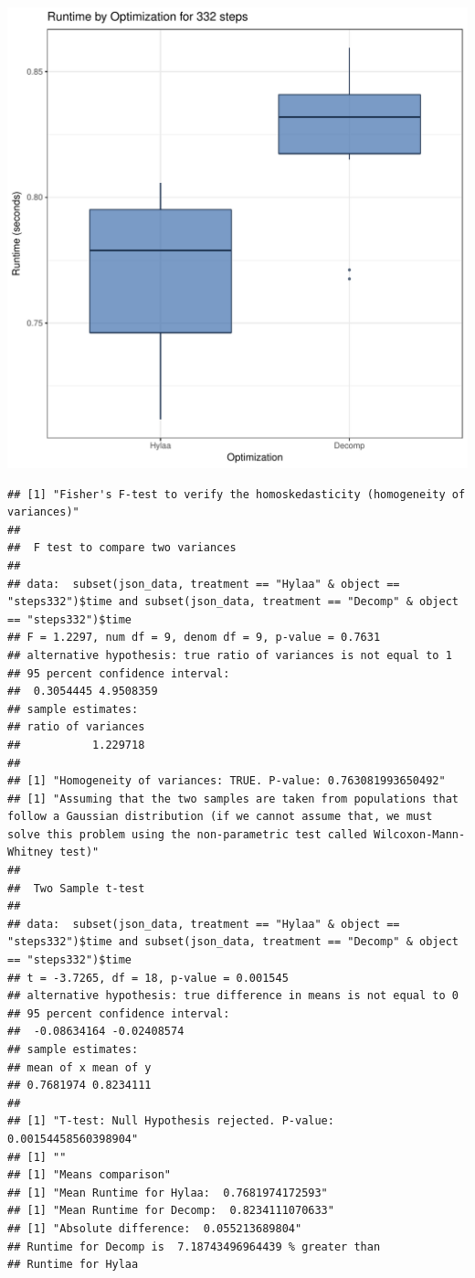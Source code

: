 \documentclass{article}\usepackage[]{graphicx}\usepackage[]{color}
\makeatletter
\def\maxwidth{ %
  \ifdim\Gin@nat@width>\linewidth
    \linewidth
  \else
    \Gin@nat@width
  \fi
}
\newenvironment{kframe}{%
 \def\at@end@of@kframe{}%
 \ifinner\ifhmode%
  \def\at@end@of@kframe{\end{minipage}}%
  \begin{minipage}{\columnwidth}%
 \fi\fi%
 \def\FrameCommand##1{\hskip\@totalleftmargin \hskip-\fboxsep
 \colorbox{shadecolor}{##1}\hskip-\fboxsep
     \hskip-\linewidth \hskip-\@totalleftmargin \hskip\columnwidth}%
 \MakeFramed {\advance\hsize-\width
   \@totalleftmargin\z@ \linewidth\hsize
   \@setminipage}}%
 {\par\unskip\endMakeFramed%
 \at@end@of@kframe}
\newenvironment{knitrout}{}{} %
\makeatother
\begin{document}
\begin{knitrout}
\color{fgcolor}
\includegraphics[width=\maxwidth]{figure/RH2_steps332-1} 
\begin{kframe}\begin{verbatim}
## [1] "Fisher's F-test to verify the homoskedasticity (homogeneity of variances)"
## 
## 	F test to compare two variances
## 
## data:  subset(json_data, treatment == "Hylaa" & object == "steps332")$time and subset(json_data, treatment == "Decomp" & object == "steps332")$time
## F = 1.2297, num df = 9, denom df = 9, p-value = 0.7631
## alternative hypothesis: true ratio of variances is not equal to 1
## 95 percent confidence interval:
##  0.3054445 4.9508359
## sample estimates:
## ratio of variances 
##           1.229718 
## 
## [1] "Homogeneity of variances: TRUE. P-value: 0.763081993650492"
## [1] "Assuming that the two samples are taken from populations that follow a Gaussian distribution (if we cannot assume that, we must solve this problem using the non-parametric test called Wilcoxon-Mann-Whitney test)"
## 
## 	Two Sample t-test
## 
## data:  subset(json_data, treatment == "Hylaa" & object == "steps332")$time and subset(json_data, treatment == "Decomp" & object == "steps332")$time
## t = -3.7265, df = 18, p-value = 0.001545
## alternative hypothesis: true difference in means is not equal to 0
## 95 percent confidence interval:
##  -0.08634164 -0.02408574
## sample estimates:
## mean of x mean of y 
## 0.7681974 0.8234111 
## 
## [1] "T-test: Null Hypothesis rejected. P-value: 0.00154458560398904"
## [1] ""
## [1] "Means comparison"
## [1] "Mean Runtime for Hylaa:  0.7681974172593"
## [1] "Mean Runtime for Decomp:  0.8234111070633"
## [1] "Absolute difference:  0.055213689804"
## Runtime for Decomp is  7.18743496964439 % greater than 
## Runtime for Hylaa
\end{verbatim}
\end{kframe}
\end{knitrout}
\end{document}
